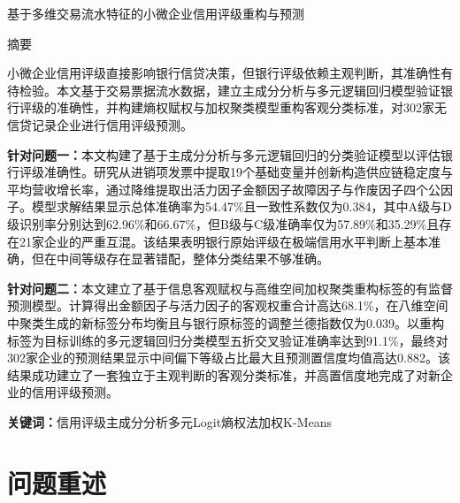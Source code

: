 \documentclass[12pt,a4paper,AutoFakeBold=2]{ctexart}
\begin{document}
\pagestyle{plain}

\begin{center}
{\heiti 基于多维交易流水特征的小微企业信用评级重构与预测}
\end{center}
\vspace{1em}

\setcounter{page}{1}

\begin{center}\heiti{}摘\quad 要\end{center}\songti

小微企业信用评级直接影响银行信贷决策，但银行评级依赖主观判断，其准确性有待检验。本文基于交易票据流水数据，建立主成分分析与多元逻辑回归模型验证银行评级的准确性，并构建熵权赋权与加权聚类模型重构客观分类标准，对302家无信贷记录企业进行信用评级预测。

\textbf{针对问题一：}本文构建了基于主成分分析与多元逻辑回归的分类验证模型以评估银行评级准确性。研究从进销项发票中提取19个基础变量并创新构造供应链稳定度与平均营收增长率，通过降维提取出活力因子金额因子故障因子与作废因子四个公因子。模型求解结果显示总体准确率为54.47\%且一致性系数仅为0.384，其中A级与D级识别率分别达到62.96\%和66.67\%，但B级与C级准确率仅为57.89\%和35.29\%且存在21家企业的严重互混。该结果表明银行原始评级在极端信用水平判断上基本准确，但在中间等级存在显著错配，整体分类结果不够准确。

\textbf{针对问题二：}本文建立了基于信息客观赋权与高维空间加权聚类重构标签的有监督预测模型。计算得出金额因子与活力因子的客观权重合计高达68.1\%，在八维空间中聚类生成的新标签分布均衡且与银行原标签的调整兰德指数仅为0.039。以重构标签为目标训练的多元逻辑回归分类模型五折交叉验证准确率达到91.1\%，最终对302家企业的预测结果显示中间偏下等级占比最大且预测置信度均值高达0.882。该结果成功建立了一套独立于主观判断的客观分类标准，并高置信度地完成了对新企业的信用评级预测。

\par\noindent\textbf{关键词：}信用评级\quad 主成分分析\quad 多元Logit\quad 熵权法\quad 加权K-Means

\newpage


\section{问题重述}
\end{document}
